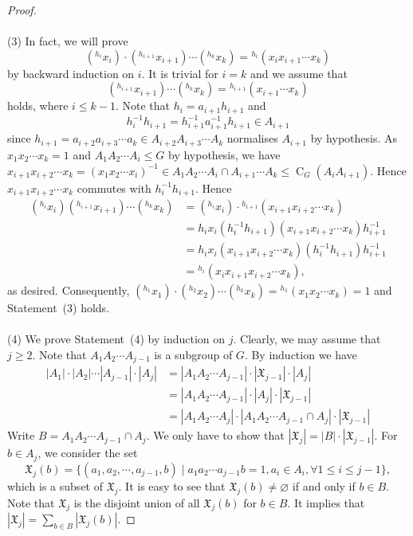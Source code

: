 \documentclass[10pt,a4paper]{amsart}
\DeclareMathOperator{\C}{C}
\newcommand\XX{\mathfrak{X}}
\begin{document}
\begin{proof}
\\
\\
(3) In fact, we will prove
$$({}^{h_i}x_i)\cdot ({}^{h_{i+1}}x_{i+1}) \cdots ({}^{h_k}x_k)={}^{h_i}(x_ix_{i+1}\cdots x_k)$$
by backward induction on $i$. It is trivial for $i=k$ and we assume that
$$({}^{h_{i+1}}x_{i+1}) \cdots ({}^{h_k}x_k)={}^{h_{i+1}}(x_{i+1}\cdots x_k)$$
holds, where $i \leq k-1$.
Note that $h_i=a_{i+1}h_{i+1}$ and $$h_i^{-1}h_{i+1}=h_{i+1}^{-1}a_{i+1}^{-1}h_{i+1} \in A_{i+1}$$
since $h_{i+1}=a_{i+2}a_{i+3} \cdots a_{k} \in A_{i+2}A_{i+3}\cdots A_k$ normalises $A_{i+1}$ by hypothesis.
As $x_1x_2\cdots x_k=1$ and $A_1A_2\cdots A_i \leq G$ by hypothesis, we have
$x_{i+1}x_{i+2}\cdots x_k=(x_1x_2\cdots x_i)^{-1} \in A_1A_2\cdots A_i \cap A_{i+1} \cdots A_k \leq \C_G(A_iA_{i+1}).$
Hence $x_{i+1}x_{i+2}\cdots x_k$ commutes with $h_i^{-1}h_{i+1}$. Hence
$$
\begin{aligned}
({}^{h_{i}}x_{i})({}^{h_{i+1}}x_{i+1}) \cdots ({}^{h_k}x_k)&=({}^{h_{i}}x_{i}) \cdot {}^{h_{i+1}}(x_{i+1}x_{i+2}\cdots x_k)\\
&=h_ix_i(h_i^{-1}h_{i+1})(x_{i+1}x_{i+2}\cdots x_k)h_{i+1}^{-1}\\
&=h_ix_i(x_{i+1}x_{i+2}\cdots x_k)(h_i^{-1}h_{i+1})h_{i+1}^{-1}\\
&={}^{h_i}(x_ix_{i+1}x_{i+2}\cdots x_k),
\end{aligned}
$$
as desired. Consequently, $({}^{h_1}x_1)\cdot ({}^{h_{2}}x_{2}) \cdots ({}^{h_k}x_k)={}^{h_1}(x_1x_{2}\cdots x_k)=1$ and Statement~(3) holds.
\\
\\
(4) We prove Statement~(4) by induction on $j$. Clearly, we may assume that $j \geq 2$. Note that $A_1A_2 \cdots A_{j-1}$ is a subgroup of $G$. By induction we have
$$
\begin{aligned}
|A_1|\cdot |A_2| \cdots |A_{j-1}| \cdot |A_j|&=|A_1A_2\cdots A_{j-1}| \cdot |\XX_{j-1}| \cdot |A_j|\\
&= |A_1A_2\cdots A_{j-1}|\cdot |A_j| \cdot |\XX_{j-1}| \\
&=|A_1A_2\cdots A_j| \cdot |A_1A_2\cdots A_{j-1} \cap A_j| \cdot |\XX_{j-1}|
\end{aligned}
$$
Write $B=A_1A_2\cdots A_{j-1} \cap A_j$. We only have to show that
$|\XX_j|=|B| \cdot |\XX_{j-1}|$.
For $b \in A_j$, we consider the set
$$\XX_j(b)=\{(a_1,a_2,\cdots,a_{j-1},b) \mid a_1a_2\cdots a_{j-1}b=1, a_i \in A_i, \forall 1 \leq i \leq j-1\},$$
which is a subset of $\XX_j$.
 It is easy to see that $\XX_j(b) \neq \varnothing$ if and only if $b \in B$. Note that $\XX_j$ is the disjoint union of all $\XX_j(b)$ for $b \in B$. It implies that $|\XX_j|=\sum_{b \in B} |\XX_j(b)|.$


\end{proof}
\end{document}
